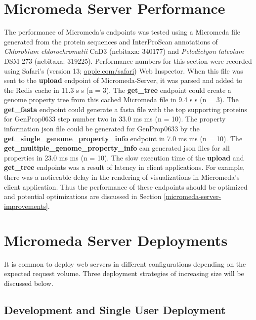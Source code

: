 \section{Micromeda Server Performance} \label{micromeda-server-performance}

The performance of Micromeda's endpoints was tested using a Micromeda file 
generated from the protein sequences and InterProScan annotations of 
\textit{Chlorobium chlorochromatii} CaD3 (\gls{ncbitaxa}: 340177) and 
\textit{Pelodictyon luteolum} DSM 273 (\gls{ncbitaxa}:  319225). 
Performance numbers for this section were recorded using Safari's 
(version 13; \href{http://apple.com/safari}{apple.com/safari}) Web Inspector.
When this file was sent to the \textbf{upload} endpoint of Micromeda-Server, it 
was parsed and added to the Redis cache in 11.3 s  s (\gls{n} = 3). 
The \textbf{get\_tree} endpoint could create a genome property tree from this 
cached Micromeda file in 9.4 s  s (\gls{n} = 3). The 
\textbf{get\_fasta} endpoint could generate a \gls{fasta} file with the top supporting 
proteins for GenProp0633 step number two in 33.0 ms  ms (\gls{n} = 
10). The property information \gls{json} file could be generated for GenProp0633 
by the \textbf{get\_single\_genome\_property\_info} endpoint in 7.0 ms  ms (\gls{n} = 10). The \textbf{get\_multiple\_genome\_property\_info} can 
generated \gls{json} files for all properties in 23.0 ms  ms (\gls{n} 
= 10). The slow execution time of the \textbf{upload} and \textbf{get\_tree} 
endpoints was a result of latency in client applications. For example, there was 
a noticeable delay in the rendering of visualizations in Micromeda's client 
application. Thus the performance of these endpoints should be optimized and 
potential optimizations are discussed in Section 
\ref{micromeda-server-improvements}.

\section{Micromeda Server Deployments} \label{micromeda-server-deployments}

It is common to deploy web servers in different configurations depending on the 
expected request volume. Three deployment strategies of increasing size will be 
discussed below. 

\subsection{Development and Single User Deployment}

